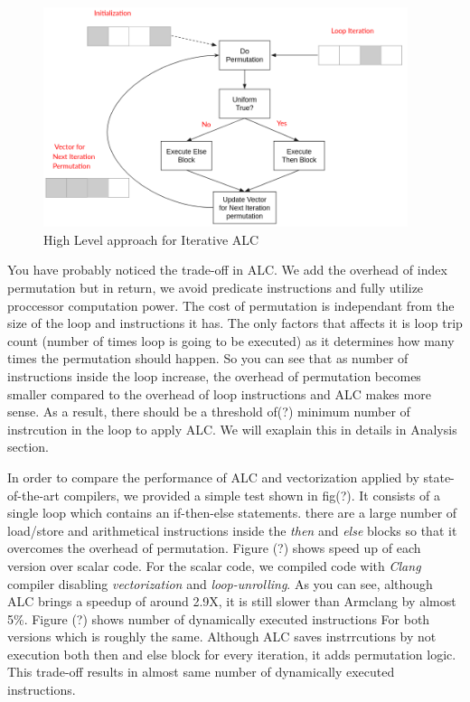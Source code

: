\documentclass[\main/thesis.tex]{subfiles}
\begin{document}
\begin{figure}[t!]
    \centering
    \includegraphics[width=0.95\textwidth]{img/iterative_alc.png}
    \caption{High Level approach for Iterative ALC}
    \label{fig:iterative_alc}
\end{figure}

You have probably noticed the trade-off in ALC. We add the overhead of index permutation but in return, we avoid predicate instructions and fully utilize proccessor computation power. The cost of permutation is independant from the size of the loop and instructions it has. The only factors that affects it is loop trip count (number of times loop is going to be executed) as it determines how many times the permutation should happen.
So you can see that as number of instructions inside the loop increase, the overhead of permutation becomes smaller compared to the overhead of loop instructions and ALC makes more sense. As a result, there should be a threshold of(?) minimum number of instrcution in the loop to apply ALC. We will exaplain this in details in Analysis section.

In order to compare the performance of ALC and vectorization applied by state-of-the-art compilers, we provided a simple test shown in fig(?). It consists of a single loop which contains an if-then-else statements. there are a large number of load/store and arithmetical instructions inside the \emph{then} and \emph{else} blocks so that it overcomes the overhead of permutation. Figure (?) shows speed up of each version over scalar code.
For the scalar code, we compiled code with \emph{Clang} compiler disabling \emph{vectorization} and \emph{loop-unrolling}. As you can see, although ALC brings a speedup of around 2.9X, it is still slower than Armclang by almost 5\%.
Figure (?) shows number of dynamically executed instructions For both versions which is roughly the same. Although ALC saves instrrcutions by not execution both then and else block for every iteration, it adds permutation logic. This trade-off results in almost same number of dynamically executed instructions.  
\end{document}
